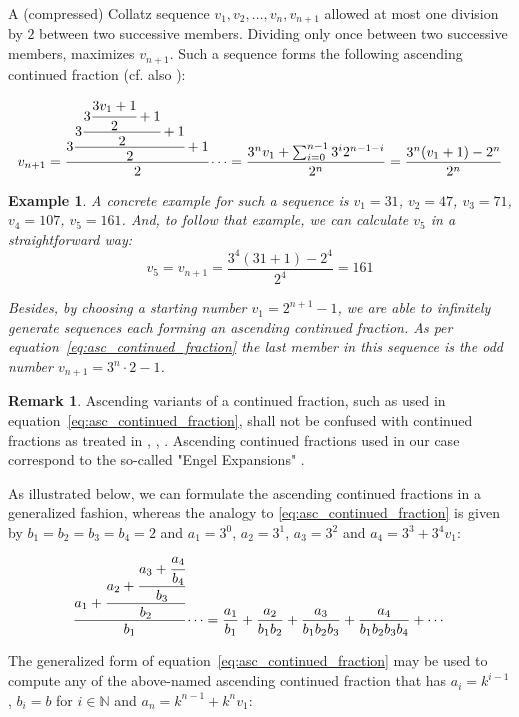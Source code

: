 \documentclass[12pt]{amsart}
\newtheorem{example}[theorem]{Example}
\theoremstyle{definition}
\newtheorem{remark}[theorem]{Remark}
\begin{document}
\par\medskip
A (compressed) Collatz sequence $v_1,v_2,\ldots,v_n,v_{n+1}$ allowed at most one division by $2$ between two successive members. Dividing only once between two successive members, maximizes $v_{n+1}$. Such a sequence forms the following ascending continued fraction (cf. also \cite[p.~11]{Ref_Laarhoven}):

\begin{equation}
\label{eq:asc_continued_fraction}
v_{n+1}=\cfrac{3\cfrac{3\cfrac{3\cfrac{3v_1+1}{2}+1}{2}+1}{2}+1}{2}\dotsb
=\frac{3^nv_1+\sum_{i=0}^{n-1}3^i2^{n-1-i}}{2^n}
=\frac{3^n(v_1+1)-2^n}{2^n}
\end{equation}

\medskip
\begin{example}
A concrete example for such a sequence is $v_1=31$, $v_2=47$, $v_3=71$, $v_4=107$, $v_5=161$. And, to follow that example, we can calculate $v_5$ in a straightforward way:
\[
v_5=v_{n+1}=\frac{3^4(31+1)-2^4}{2^4}=161
\]

\par\medskip
Besides, by choosing a starting number $v_1=2^{n+1}-1$, we are able to infinitely generate sequences each forming an ascending continued fraction. As per equation~\ref{eq:asc_continued_fraction} the last member in this sequence is the odd number $v_{n+1}=3^n\cdot2-1$.
\end{example}

\bigskip
\begin{remark}
Ascending variants of a continued fraction, such as used in equation~\ref{eq:asc_continued_fraction}, shall not be confused with continued fractions as treated in \cite{Ref_Moore}, \cite{Ref_Hensley}, \cite{Ref_Borwe_etal}. Ascending continued fractions used in our case correspond to the so-called "Engel Expansions" \cite{Ref_Kraaikamp_Wu}.
\end{remark}

\par\noindent
As illustrated below, we can formulate the ascending continued fractions in a generalized fashion, whereas the analogy to \ref{eq:asc_continued_fraction} is given by $b_1=b_2=b_3=b_4=2$ and $a_1=3^0$, $a_2=3^1$, $a_3=3^2$ and $a_4=3^3+3^4v_1$:
\[
\cfrac{a_1+\cfrac{a_2+\cfrac{a_3+\cfrac{a_4}{b_4}}{b_3}}{b_2}}{b_1}\dotsb=\frac{a_1}{b_1}+\frac{a_2}{b_1b_2}+\frac{a_3}{b_1b_2b_3}+\frac{a_4}{b_1b_2b_3b_4}+\cdots
\]

\par\medskip
The generalized form of equation~\ref{eq:asc_continued_fraction} may be used to compute any of the above-named ascending continued fraction that has $a_i=k^{i-1}$, $b_i=b$ for $i\in\mathbb{N}$ and $a_n=k^{n-1}+k^nv_1$:
\end{document}
